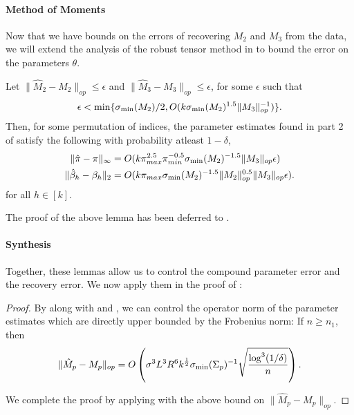 \paragraph{Method of Moments} 

Now that we have bounds on the errors of recovering $M_2$ and $M_3$ from
the data, we will extend the analysis of the robust tensor method in
\citet{AnandkumarGeHsu2012} to bound the error on the parameters
$\theta$. 
\begin{lemma}
  \label{lem:tensorPower} Let $\|\hat M_2 - M_2\|_{op} \le \epsilon$ and
  $\|\hat M_3 - M_3\|_{op} \le \epsilon$, for some $\epsilon$ such that 
  $$\epsilon < \min\{\sigma_\text{\rm min}(M_2)/2,O(k \sigma_\text{\rm min}(M_2)^{1.5} \|M_3\|_{op}^{-1})\}.$$ 
  Then, for some permutation of indices, the parameter estimates found
  in part 2 of  satisfy the
  following with probability atleast $1 - \delta$,
  \begin{align*}
  \|\hat \pi - \pi \|_{\infty}
    &= O( k \pi_{max}^{2.5} \pi_{min}^{-0.5} \sigma_\text{\rm min}(M_2)^{-1.5} \|M_3\|_{op} \epsilon ) \\
  \|\hat \beta_h - \beta_h\|_2
    &= O( k \pi_{max} \sigma_\text{\rm min}(M_2)^{-1.5} \|M_2\|_{op}^{0.5} \|M_3\|_{op} \epsilon ).
  \end{align*}
  for all $h \in [k]$.
\end{lemma}
The proof of the above lemma has been deferred to
. 

\paragraph{Synthesis}
Together, these lemmas allow us to control the compound parameter error
and the recovery error. We now apply them in the proof of
:

\begin{proof}
By  along with  and
, we can control the operator norm of the parameter
estimates which are directly upper bounded by the Frobenius norm: If $n
\ge n_1$, then
\begin{align}
  \|\hat M_p - M_p\|_{op} = O\left( \sigma^3 L^3 R^6 k^{\frac12} \sigma_\text{\rm min}(\Sigma_p)^{-1} \sqrt{\frac{\log^3 (1/\delta)}{n}} \right).
\end{align}

We complete the proof by applying  with the above
bound on $\|\hat M_p - M_p\|_{op}$.

\end{proof}

